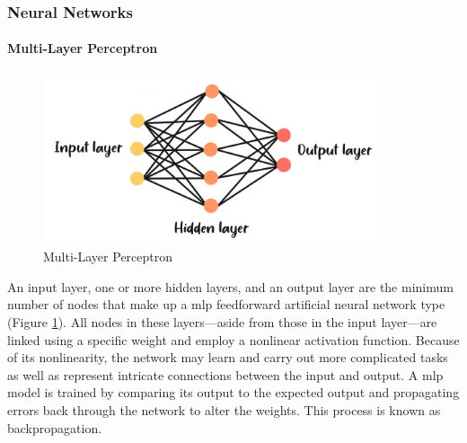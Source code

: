 \subsubsection{Neural Networks}
\paragraph{Multi-Layer Perceptron}
\begin{figure}[!ht]
    \centering
    \includegraphics[width=10cm]{Images/mlp.png}
    \caption{Multi-Layer Perceptron}
    \label{fig:mlp}
\end{figure}
An input layer, one or more hidden layers, and an output layer are the minimum number of nodes that make up a \gls{mlp} feedforward artificial neural network type (Figure \ref{fig:mlp}).
All nodes in these layers—aside from those in the input layer—are linked using a specific weight and employ a nonlinear activation function.
Because of its nonlinearity, the network may learn and carry out more complicated tasks as well as represent intricate connections between the input and output.
A \gls{mlp} model is trained by comparing its output to the expected output and propagating errors back through the network to alter the weights. 
This process is known as backpropagation. \\\cite{haykin_2014_neural}

